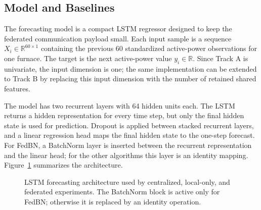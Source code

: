 \documentclass[pdflatex,sn-mathphys-num]{sn-jnl}
\theoremstyle{thmstyleone}%
\theoremstyle{thmstyletwo}%
\theoremstyle{thmstylethree}%
\begin{document}
\subsection{Model and Baselines}\label{sec:lstm-architecture}

The forecasting model is a compact LSTM regressor designed to keep the federated communication payload small. Each input sample is a sequence
$X_i \in \mathbb{R}^{60 \times 1}$ containing the previous 60 standardized active-power observations for one furnace. The target is the next active-power value $y_i \in \mathbb{R}$. Since Track A is univariate, the input dimension is one; the same implementation can be extended to Track B by replacing this input dimension with the number of retained shared features.

The model has two recurrent layers with 64 hidden units each. The LSTM returns a hidden representation for every time step, but only the final hidden state is used for prediction. Dropout is applied between stacked recurrent layers, and a linear regression head maps the final hidden state to the one-step forecast. For FedBN, a BatchNorm layer is inserted between the recurrent representation and the linear head; for the other algorithms this layer is an identity mapping. Figure~\ref{fig:model-architecture} summarizes the architecture.

\begin{figure}[H]
\centering
{}
\caption{LSTM forecasting architecture used by centralized, local-only, and federated experiments. The BatchNorm block is active only for FedBN; otherwise it is replaced by an identity operation.}
\label{fig:model-architecture}
\end{figure}
\end{document}

